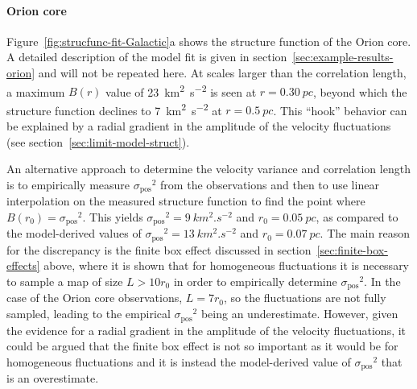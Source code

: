 \documentclass[fleqn,usenatbib, useAMS, a4paper]{mnras}
\newcommand\startNEW{\color{NEWcolor}}
\newcommand\stopNEW{\color{black}}
\newcommand\pos{\ensuremath{_{\mathrm{pos}}}}
\begin{document}
\paragraph*{Orion core}
 
Figure~\ref{fig:strucfunc-fit-Galactic}a shows the structure function of the Orion core.
A detailed description of the model fit is given in section~\ref{sec:example-results-orion} and will not be repeated here.
\startNEW
At scales larger than the correlation length,
a maximum \(B(r)\) value of \SI{23}{km^{2}.s^{-2}} is seen at \(r = \SI{0.30}{pc}\),
beyond which the structure function declines to \SI{7}{km^{2}.s^{-2}} at \(r =  \SI{0.5}{pc}\). 
This ``hook'' behavior can be explained by a radial gradient in the
amplitude of the velocity fluctuations (see section~\ref{sec:limit-model-struct}).

An alternative approach to determine the velocity variance and correlation length
is to empirically measure \(\sigma\pos^2\) from the observations and then to use linear
interpolation on the measured structure function to find the point where \(B(r_0) = \sigma\pos^2\).
This yields \(\sigma\pos^2 = \SI{9}{km^{2}.s^{-2}}\) and \(r_0 = \SI{0.05}{pc} \),
as compared to the model-derived values of \(\sigma\pos^2 = \SI{13}{km^{2}.s^{-2}}\) and \(r_0 = \SI{0.07}{pc} \).
The main reason for the discrepancy is the finite box effect
discussed in section~\ref{sec:finite-box-effects} above, where it is shown
that for homogeneous fluctuations it is necessary to sample a map of size \(L > 10 r_0\)
in order to empirically determine \(\sigma\pos^2\).
In the case of the Orion core observations, \(L = 7 r_0\),
so the fluctuations are not fully sampled, leading
to the empirical \(\sigma\pos^2\) being an underestimate.
However, given the evidence for a radial gradient in the amplitude of the velocity fluctuations,
it could be argued that the finite box effect is not so important as it would be for homogeneous fluctuations
and it is instead the model-derived value of \(\sigma\pos^2\) that is an overestimate.
\stopNEW

\end{document}
